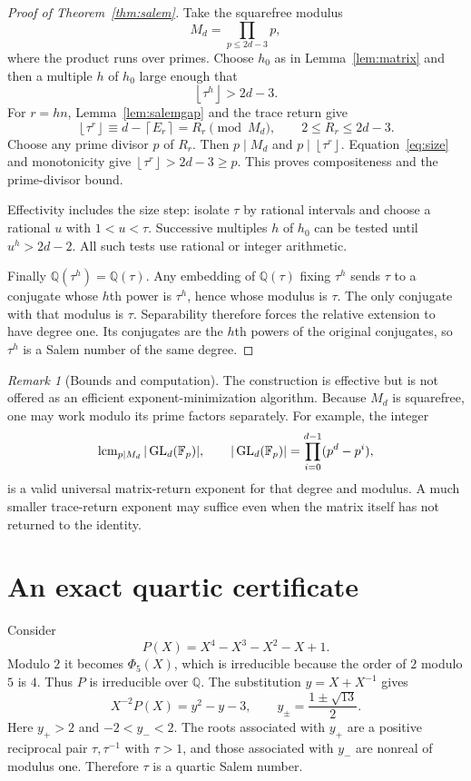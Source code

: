 \documentclass[11pt,a4paper]{article}
\theoremstyle{definition}\newtheorem{definition}[theorem]{Definition}
\theoremstyle{remark}\newtheorem{remark}[theorem]{Remark}
\newcommand{\Q}{\mathbb Q}\newcommand{\Z}{\mathbb Z}\newcommand{\N}{\mathbb N}\newcommand{\R}{\mathbb R}\newcommand{\C}{\mathbb C}
\newcommand{\floor}[1]{\left\lfloor #1\right\rfloor}\newcommand{\ceil}[1]{\left\lceil #1\right\rceil}
\begin{document}
\begin{proof}[Proof of Theorem~\ref{thm:salem}]
Take the squarefree modulus
\[
 M_d=\prod_{p\le2d-3}p,
\]
where the product runs over primes. Choose $h_0$ as in Lemma~\ref{lem:matrix} and then a multiple $h$ of $h_0$ large enough that
\begin{equation}\label{eq:size}
 \floor{\tau^h}>2d-3.
\end{equation}
For $r=hn$, Lemma~\ref{lem:salemgap} and the trace return give
\[
 \floor{\tau^r}\equiv d-\ceil{E_r}=R_r\pmod {M_d},
 \qquad 2\le R_r\le2d-3.
\]
Choose any prime divisor $p$ of $R_r$. Then $p\mid M_d$ and $p\mid\floor{\tau^r}$. Equation~\eqref{eq:size} and monotonicity give $\floor{\tau^r}>2d-3\ge p$. This proves compositeness and the prime-divisor bound.

Effectivity includes the size step: isolate $\tau$ by rational intervals and choose a rational $u$ with $1<u<\tau$. Successive multiples $h$ of $h_0$ can be tested until $u^h>2d-2$. All such tests use rational or integer arithmetic.

Finally $\Q(\tau^h)=\Q(\tau)$. Any embedding of $\Q(\tau)$ fixing $\tau^h$ sends $\tau$ to a conjugate whose $h$th power is $\tau^h$, hence whose modulus is $\tau$. The only conjugate with that modulus is $\tau$. Separability therefore forces the relative extension to have degree one. Its conjugates are the $h$th powers of the original conjugates, so $\tau^h$ is a Salem number of the same degree.
\end{proof}

\begin{remark}[Bounds and computation]
The construction is effective but is not offered as an efficient exponent-minimization algorithm. Because $M_d$ is squarefree, one may work modulo its prime factors separately. For example, the integer
\[
 \operatorname{lcm}_{p\mid M_d}|\operatorname{GL}_d(\mathbb F_p)|,
 \qquad |\operatorname{GL}_d(\mathbb F_p)|=\prod_{i=0}^{d-1}(p^d-p^i),
\]
is a valid universal matrix-return exponent for that degree and modulus. A much smaller trace-return exponent may suffice even when the matrix itself has not returned to the identity.
\end{remark}

\section{An exact quartic certificate}
Consider
\[
 P(X)=X^4-X^3-X^2-X+1.
\]
Modulo $2$ it becomes $\Phi_5(X)$, which is irreducible because the order of $2$ modulo $5$ is $4$. Thus $P$ is irreducible over $\Q$. The substitution $y=X+X^{-1}$ gives
\[
 X^{-2}P(X)=y^2-y-3,
 \qquad y_\pm=\frac{1\pm\sqrt{13}}2.
\]
Here $y_+>2$ and $-2<y_-<2$. The roots associated with $y_+$ are a positive reciprocal pair $\tau,\tau^{-1}$ with $\tau>1$, and those associated with $y_-$ are nonreal of modulus one. Therefore $\tau$ is a quartic Salem number.
\end{document}
